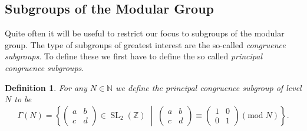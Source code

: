 \documentclass[a4paper]{article}
\theoremstyle{theoremdd}
\theoremstyle{definitiondd}
\newtheorem{definition}[theorem]{Definition}
\theoremstyle{remarkdd}
\newcommand{\N}{\mathbb{N}}
\newcommand{\Z}{\mathbb{Z}}
\newcommand{\bigset}[2]{ \left\{ #1 \;\middle|\; #2 \right\} }
\DeclareMathOperator{\SL}{SL}
\begin{document}
\subsection{Subgroups of the Modular Group} \label{sec:subgroups_of_the_modular_group}
Quite often it will be useful to restrict our focus to subgroups of the modular group. 
The type of subgroups of greatest interest are the so-called \emph{congruence subgroups}.
To define these we first have to define the so called \emph{principal congruence subgroups}.  
\begin{definition}
	For any $N \in \N$ we define the \emph{principal congruence subgroup of level $N$} to be \[
		\Gamma(N) = \bigset{\begin{pmatrix} a & b \\ c & d \end{pmatrix} \in \SL_2(\Z)}{\begin{pmatrix} a & b \\ c & d \end{pmatrix}  \equiv \begin{pmatrix} 1 & 0 \\ 0 & 1 \end{pmatrix}  (\mathrm{mod}\; N)}
	.\] 
\end{definition}
\end{document}
